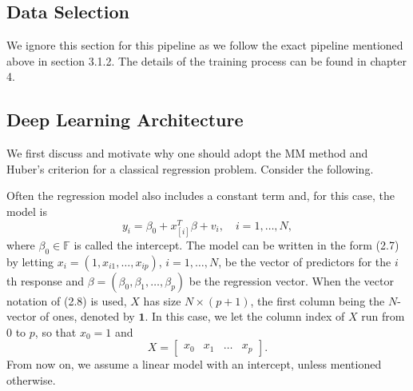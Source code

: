 \subsection{Data Selection}
We ignore this section for this pipeline as we follow the exact pipeline mentioned above in section 3.1.2. The details of the training process can be found in chapter 4. 
\subsection{Deep Learning Architecture}

We first discuss and motivate why one should adopt the MM method and Huber's criterion for a classical regression problem. Consider the following. 

Often the regression model also includes a constant term and, for this case, the model is
\[
y_i = \beta_0 + x_{[i]}^T\beta + v_i, \quad i = 1, \ldots ,N,
\]
where $\beta_0 \in \mathbb{F}$ is called the intercept. The model can be written in the form (2.7) by letting $x_{i} = (1, x_{i1}, \ldots , x_{ip})$, $i = 1, \ldots ,N$, be the vector of predictors for the $i$th response and $\beta = (\beta_0, \beta_1, \ldots , \beta_p)$ be the regression vector. When the vector notation of (2.8) is used, $X$ has size $N \times (p + 1)$, the first column being the $N$-vector of ones, denoted by $\mathbf{1}$. In this case, we let the column index of $X$ run from $0$ to $p$, so that $x_0 = 1$ and
\[
X = \begin{bmatrix}
x_0 & x_1 & \ldots & x_p
\end{bmatrix}.
\]
From now on, we assume a linear model with an intercept, unless mentioned otherwise.


